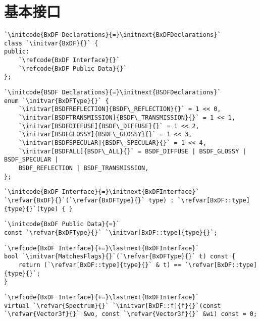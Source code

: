 \section{基本接口}\label{sec:基本接口}

\begin{lstlisting}
`\initcode{BxDF Declarations}{=}\initnext{BxDFDeclarations}`
class `\initvar{BxDF}{}` {
public:
    `\refcode{BxDF Interface}{}`
    `\refcode{BxDF Public Data}{}`
};
\end{lstlisting}

\begin{lstlisting}
`\initcode{BSDF Declarations}{=}\initnext{BSDFDeclarations}`
enum `\initvar{BxDFType}{}` {
    `\initvar[BSDFREFLECTION]{BSDF\_REFLECTION}{}` = 1 << 0,
    `\initvar[BSDFTRANSMISSION]{BSDF\_TRANSMISSION}{}` = 1 << 1,
    `\initvar[BSDFDIFFUSE]{BSDF\_DIFFUSE}{}` = 1 << 2,
    `\initvar[BSDFGLOSSY]{BSDF\_GLOSSY}{}` = 1 << 3,
    `\initvar[BSDFSPECULAR]{BSDF\_SPECULAR}{}` = 1 << 4,
    `\initvar[BSDFALL]{BSDF\_ALL}{}` = BSDF_DIFFUSE | BSDF_GLOSSY | BSDF_SPECULAR |
    BSDF_REFLECTION | BSDF_TRANSMISSION,
};
\end{lstlisting}

\begin{lstlisting}
`\initcode{BxDF Interface}{=}\initnext{BxDFInterface}`
`\refvar{BxDF}{}`(`\refvar{BxDFType}{}` type) : `\refvar[BxDF::type]{type}{}`(type) { }
\end{lstlisting}

\begin{lstlisting}
`\initcode{BxDF Public Data}{=}`
const `\refvar{BxDFType}{}` `\initvar[BxDF::type]{type}{}`;
\end{lstlisting}

\begin{lstlisting}
`\refcode{BxDF Interface}{+=}\lastnext{BxDFInterface}`
bool `\initvar{MatchesFlags}{}`(`\refvar{BxDFType}{}` t) const {
    return (`\refvar[BxDF::type]{type}{}` & t) == `\refvar[BxDF::type]{type}{}`;
}
\end{lstlisting}

\begin{lstlisting}
`\refcode{BxDF Interface}{+=}\lastnext{BxDFInterface}`
virtual `\refvar{Spectrum}{}` `\initvar[BxDF::f]{f}{}`(const `\refvar{Vector3f}{}` &wo, const `\refvar{Vector3f}{}` &wi) const = 0;
\end{lstlisting}